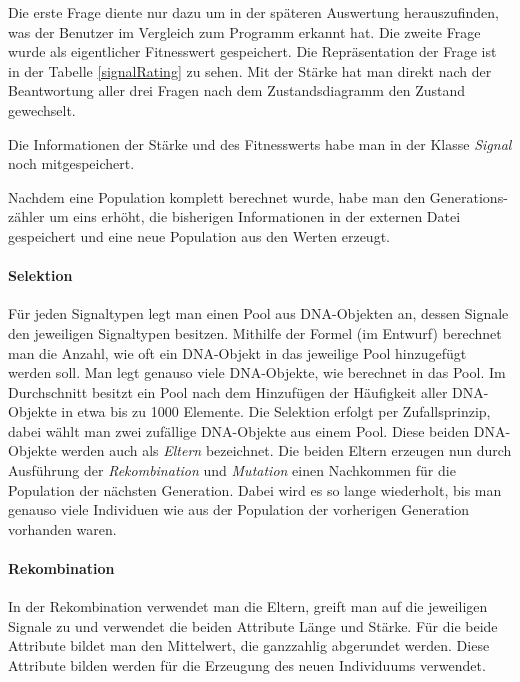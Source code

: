 Die erste Frage diente nur dazu um in der sp{\"a}teren Auswertung herauszufinden, was der Benutzer im Vergleich zum Programm erkannt hat. 
Die zweite Frage wurde als eigentlicher Fitnesswert gespeichert. Die Repr{\"a}sentation der Frage ist in der Tabelle \autoref{signalRating} zu sehen.
Mit der St{\"a}rke hat man direkt nach der Beantwortung aller drei Fragen nach dem Zustandsdiagramm den Zustand gewechselt.

Die Informationen der St{\"a}rke und des Fitnesswerts habe man in der Klasse \textit{Signal} noch mitgespeichert.

Nachdem eine Population komplett berechnet wurde, habe man den Generations-z{\"a}hler um eins erh{\"o}ht, die bisherigen Informationen in der externen Datei gespeichert und eine neue Population aus den Werten erzeugt.

\paragraph{Selektion}
F{\"u}r jeden Signaltypen legt man einen Pool aus DNA-Objekten an, dessen Signale den jeweiligen Signaltypen besitzen.
Mithilfe der Formel (im Entwurf) berechnet man die Anzahl, wie oft ein DNA-Objekt in das jeweilige Pool hinzugef{\"u}gt werden soll. Man legt genauso viele DNA-Objekte, wie berechnet in das Pool. 
Im Durchschnitt besitzt ein Pool nach dem Hinzuf{\"u}gen der H{\"a}ufigkeit aller DNA-Objekte in etwa bis zu 1000 Elemente.
Die Selektion erfolgt per Zufallsprinzip, dabei w{\"a}hlt man zwei zuf{\"a}llige DNA-Objekte aus einem Pool. Diese beiden DNA-Objekte werden auch als \textit{Eltern} bezeichnet. Die beiden Eltern erzeugen nun durch Ausf{\"u}hrung der \textit{Rekombination} und \textit{Mutation} einen Nachkommen f{\"u}r die Population der n{\"a}chsten Generation. Dabei wird es so lange wiederholt, bis man genauso viele Individuen wie aus der Population der vorherigen Generation vorhanden waren.

\paragraph{Rekombination}
In der Rekombination verwendet man die Eltern, greift man auf die jeweiligen Signale zu und verwendet die beiden Attribute L{\"a}nge und St{\"a}rke. 
F{\"u}r die beide Attribute bildet man den Mittelwert, die ganzzahlig abgerundet werden.
Diese Attribute bilden werden f{\"u}r die Erzeugung des neuen Individuums verwendet.

